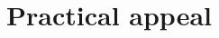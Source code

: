 \section{Practical appeal}


\label{chap:dependent-types}






































































